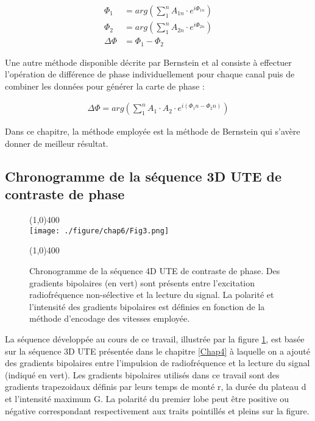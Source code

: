\begin{equation}
\begin{split}
\Phi_1 &= arg( \sum_1^n  A_{1n} \cdot e^{i \Phi_{1n}}) \\
\Phi_2 &= arg( \sum_1^n  A_{2n} \cdot e^{i \Phi_{2n}}) \\
\Delta \Phi &= \Phi_1 - \Phi_2
\end{split}
\end{equation}

Une autre méthode disponible décrite par Bernstein et al \cite{bernstein1994reconstructions} consiste à effectuer l'opération de différence de phase individuellement pour chaque canal puis de combiner les données pour générer la carte de phase :

\begin{align}
\Delta \Phi = arg(\sum_1^n A_1 \cdot A_2 \cdot e^{i(\Phi_1n - \Phi_2n)})
\end{align}

Dans ce chapitre, la méthode employée est la méthode de Bernstein qui s'avère donner de meilleur résultat.

\subsection{Chronogramme de la séquence 3D UTE de contraste de phase}

\begin{figure}[H]
\centering
\line(1,0){400} \\
\texttt{[image: ./figure/chap6/Fig3.png]}
\caption[Chronogramme 4D flux]{\label{fig:Chrono4DFlux} Chronogramme de la séquence 4D UTE de contraste de phase. Des gradients bipolaires (en vert) sont présents entre l'excitation radiofréquence non-sélective et la lecture du signal. La polarité et l'intensité des gradients bipolaires est définies en fonction de la méthode d'encodage des vitesses employée.}
\line(1,0){400} \\ 
\end{figure}

La séquence développée au cours de ce travail, illustrée par la figure \ref{fig:Chrono4DFlux}, est basée sur la séquence 3D UTE présentée dans le chapitre \ref{Chap4} à laquelle on a ajouté des gradients bipolaires entre l'impulsion de radiofréquence et la lecture du signal (indiqué en vert).
Les gradients bipolaires utilisés dans ce travail sont des gradients trapezoidaux définis par leurs temps de monté r, la durée du plateau d et l'intensité maximum G. La polarité du premier lobe peut être positive ou négative correspondant respectivement aux traits pointillés et pleins sur la figure.

